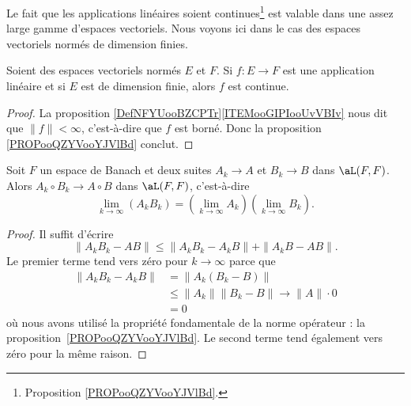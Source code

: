 Le fait que les applications linéaires soient continues\footnote{Proposition \ref{PROPooQZYVooYJVlBd}.} est valable dans une assez large gamme d'espaces vectoriels\cite{BIBooUWMLooWEPxcC}. Nous voyons ici dans le cas des espaces vectoriels normés de dimension finies.
\begin{proposition}     \label{PROPooADPDooOtukQP}
	Soient des espaces vectoriels normés \( E\) et \( F\). Si \( f\colon E\to F\) est une application linéaire et si \( E\) est de dimension finie, alors \( f\) est continue.
\end{proposition}

\begin{proof}
	La proposition \ref{DefNFYUooBZCPTr}\ref{ITEMooGIPIooUvVBIv} nous dit que \( \| f \|<\infty\), c'est-à-dire que \( f\) est borné. Donc la proposition \ref{PROPooQZYVooYJVlBd} conclut.
\end{proof}


\begin{lemma}   \label{LemWWXVSae}
	Soit \( F\) un espace de Banach et deux suites \( A_k\to A\) et \( B_k\to B\) dans \( \aL(F,F)\). Alors \( A_k\circ B_k\to A\circ B\) dans \( \aL(F,F)\), c'est-à-dire
	\begin{equation}
		\lim_{k\to \infty} (A_kB_k)=\left( \lim_{k\to \infty} A_k \right)\left( \lim_{k\to \infty} B_k \right).
	\end{equation}
\end{lemma}

\begin{proof}
	Il suffit d'écrire
	\begin{equation}
		\| A_kB_k-AB \|\leq \| A_kB_k-A_kB \|+\| A_kB-AB \|.
	\end{equation}
	Le premier terme tend vers zéro pour \( k\to\infty\) parce que
	\begin{subequations}
		\begin{align}
			\| A_kB_k-A_kB \| & =\| A_k(B_k-B) \|                           \\
			                  & \leq \| A_k \|\| B_k-B \|\to \| A \|\cdot 0 \\
			                  & =0
		\end{align}
	\end{subequations}
	où nous avons utilisé la propriété fondamentale de la norme opérateur : la proposition~\ref{PROPooQZYVooYJVlBd}. Le second terme tend également vers zéro pour la même raison.
\end{proof}

